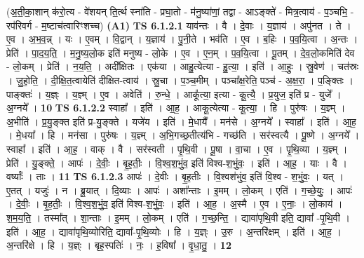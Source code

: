 \documentclass[17pt]{extarticle}
\begin{document}
                      (अ॒ती॒का॒शान् क॑रो॒त्य - वे॑शयन् ति॒र्त्थ स्ना॑ति - प्रघा॒तो - म॑नु॒ष्या॑णां॒ तद्वा - आऽङ्क्ते॑ - मित्र॒त्वाय॑ - प॒ञ्चभि॒ - रप॑रिवर्ग - म॒ष्टाच॑त्वारिꣳशच्च)  \textbf{(A1)} \newline \newline
                                \textbf{ TS 6.1.2.1} \newline
                  याव॑न्तः । वै । दे॒वाः । य॒ज्ञाय॑ । अपु॑नत । ते । ए॒व । अ॒भ॒व॒न्न् । यः । ए॒वम् । वि॒द्वान् । य॒ज्ञाय॑ । पु॒नी॒ते । भव॑ति । ए॒व । ब॒हिः । प॒व॒यि॒त्वा । अ॒न्तः । प्रेति॑ । पा॒द॒य॒ति॒ । म॒नु॒ष्य॒लो॒क इति॑ मनुष्य - लो॒के । ए॒व । ए॒न॒म् । प॒व॒यि॒त्वा । पू॒तम् । दे॒व॒लो॒कमिति॑ देव - लो॒कम् । प्रेति॑ । न॒य॒ति॒ । अदी᳚क्षितः । एक॑या । आहु॒त्येत्या - हु॒त्या॒ । इति॑ । आ॒हुः॒ । स्रु॒वेण॑ । चत॑स्रः । जु॒हो॒ति॒ । दी॒क्षि॒त॒त्वायेति॑ दीक्षित-त्वाय॑ । स्रु॒चा । प॒ञ्च॒मीम् । पञ्चा᳚क्ष॒रेति॒ पञ्च॑ - अ॒क्ष॒रा॒ । प॒ङ्क्तिः । पाङ्क्तः॑ । य॒ज्ञ्ः । य॒ज्ञ्म् । ए॒व । अवेति॑ । रु॒न्धे॒ । आकू᳚त्या॒ इत्या - कू॒त्यै॒ । प्र॒युज॒ इति॑ प्र - युजे᳚ । अ॒ग्नये᳚ । \textbf{  10} \newline
                  \newline
                                \textbf{ TS 6.1.2.2} \newline
                  स्वाहा᳚ । इति॑ । आ॒ह॒ । आकू॒त्येत्या - कू॒त्या॒ । हि । पुरु॑षः । य॒ज्ञ्म् । अ॒भीति॑ । प्र॒यु॒ङ्क्त इति॑ प्र-यु॒ङ्क्ते । यजे॑य । इति॑ । मे॒धायै᳚ । मन॑से । अ॒ग्नये᳚ । स्वाहा᳚ । इति॑ । आ॒ह॒ । मे॒धया᳚ । हि । मन॑सा । पुरु॑षः । य॒ज्ञ्म् । अ॒भि॒गच्छ॒तीत्य॑भि - गच्छ॑ति । सर॑स्वत्यै । पू॒ष्णे । अ॒ग्नये᳚ । स्वाहा᳚ । इति॑ । आ॒ह॒ । वाक् । वै । सर॑स्वती । पृ॒थि॒वी । पू॒षा । वा॒चा । ए॒व । पृ॒थि॒व्या । य॒ज्ञ्म् । प्रेति॑ । यु॒ङ्क्ते॒ । आपः॑ । दे॒वीः॒ । बृ॒ह॒तीः॒ । वि॒श्व॒श॒भुं॒व॒ इति॑ विश्व-श॒भुं॒वः॒ । इति॑ । आ॒ह॒ । याः । वै । वर्ष्याः᳚ । ताः । \textbf{  11} \newline
                  \newline
                                \textbf{ TS 6.1.2.3} \newline
                  आपः॑ । दे॒वीः । बृ॒ह॒तीः । वि॒श्वश॑भुंव॒ इति॑ वि॒श्व - श॒भुं॒वः॒ । यत् । ए॒तत् । यजुः॑ । न । ब्रू॒यात् । दि॒व्याः । आपः॑ । अशा᳚न्ताः । इ॒मम् । लो॒कम् । एति॑ । ग॒च्छे॒युः॒ । आपः॑ । दे॒वीः॒ । बृ॒ह॒तीः॒ । वि॒श्व॒श॒भुं॒व॒ इति॑ विश्व-श॒भुं॒वः॒ । इति॑ । आ॒ह॒ । अ॒स्मै । ए॒व । ए॒नाः॒ । लो॒काय॑ । श॒म॒य॒ति॒ । तस्मा᳚त् । शा॒न्ताः । इ॒मम् । लो॒कम् । एति॑ । ग॒च्छ॒न्ति॒ । द्यावा॑पृथि॒वी इति॒ द्यावा᳚ -पृ॒थि॒वी । इति॑ । आ॒ह॒ । द्यावा॑पृथि॒व्योरिति॒ द्यावा᳚-पृ॒थि॒व्योः । हि । य॒ज्ञ्ः । उ॒रु । अ॒न्तरि॑क्षम् । इति॑ । आ॒ह॒ । अ॒न्तरि॑क्षे । हि । य॒ज्ञ्ः । बृह॒स्पतिः॑ । नः॒ । ह॒विषा᳚ । वृ॒धा॒तु॒ । \textbf{  12} \newline
\end{document}
